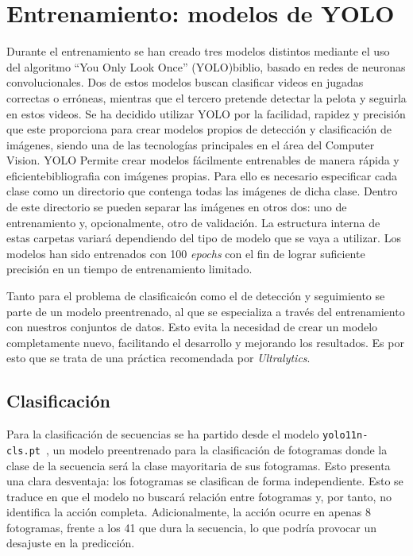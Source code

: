 \documentclass[12pt]{report} %
\begin{document}
    \section{Entrenamiento: modelos de YOLO}

    Durante el entrenamiento se han creado tres modelos distintos mediante el
    uso del algoritmo ``You Only Look Once'' (YOLO){biblio}, basado en redes de
    neuronas convolucionales. Dos de estos modelos buscan clasificar videos en
    jugadas correctas o erróneas, mientras que el tercero pretende detectar la
    pelota y seguirla en estos videos. Se ha decidido utilizar YOLO por la
    facilidad, rapidez y precisión que este proporciona para crear modelos
    propios de detección y clasificación de imágenes, siendo una de las
    tecnologías principales en el área del Computer Vision. YOLO Permite crear
    modelos fácilmente entrenables de manera rápida y eficiente{bibliografia}
    con imágenes propias. Para ello es necesario especificar cada clase como un
    directorio que contenga todas las imágenes de dicha clase. Dentro de este
    directorio se pueden separar las imágenes en otros dos: uno de
    entrenamiento y, opcionalmente, otro de validación. La estructura interna
    de estas carpetas variará dependiendo del tipo de modelo que se vaya a
    utilizar. Los modelos han sido entrenados con 100 \textit{epochs} con el
    fin de lograr suficiente precisión en un tiempo de entrenamiento limitado.

    Tanto para el problema de clasificaicón como el de detección y seguimiento
    se parte de un modelo preentrenado, al que se especializa a través del
    entrenamiento con nuestros conjuntos de datos. Esto evita la necesidad de
    crear un modelo completamente nuevo, facilitando el desarrollo y mejorando
    los resultados. Es por esto que se trata de una práctica recomendada por
    \textit{Ultralytics}.

    \subsection{Clasificación}
    Para la clasificación de secuencias se ha partido desde el modelo
    \texttt{yolo11n-cls.pt}~\cite{yolo11n-csl}, un modelo preentrenado para la
    clasificación de fotogramas donde la clase de la secuencia será la clase
    mayoritaria de sus fotogramas. Esto presenta una clara desventaja: los
    fotogramas se clasifican de forma independiente. Esto se traduce en que el
    modelo no buscará relación entre fotogramas y, por tanto, no identifica la
    acción completa. Adicionalmente, la acción ocurre en apenas 8 fotogramas,
    frente a los 41 que dura la secuencia, lo que podría provocar un desajuste
    en la predicción.
    
\end{document}
